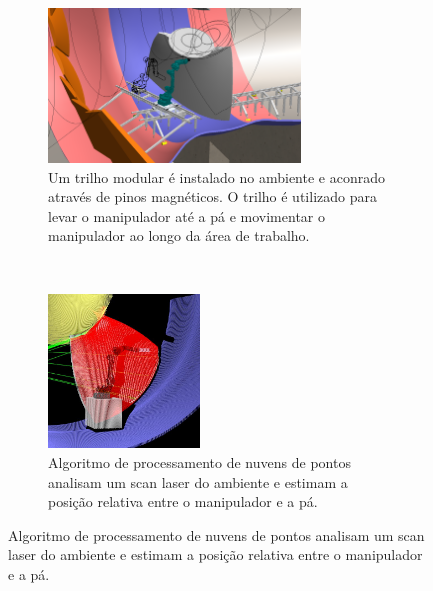 \begin{figure}[H]
\ContinuedFloat
\begin{subfigure}{0.5\textwidth}
\includegraphics[width=0.9\linewidth,
height=4.1cm]{figs/EMMA_Base_Secundaria_01}
\captionsetup{width=0.9\textwidth}
\caption{Um trilho modular é instalado no ambiente e aconrado através de pinos
magnéticos. O trilho é utilizado para levar o manipulador até a pá e movimentar
o manipulador ao longo da área de trabalho.}
\end{subfigure}
~
\begin{subfigure}{0.5\textwidth}
\label{fig:subim2}
\includegraphics[width=\linewidth, height=4.1cm]{figs/localizacao}
\captionsetup{width=0.9\textwidth}
\caption{Algoritmo de processamento de nuvens de pontos analisam um scan laser
do ambiente e estimam a posição relativa entre o manipulador e a pá.}
\end{subfigure}
 \label{fig:image2}
\end{figure}



